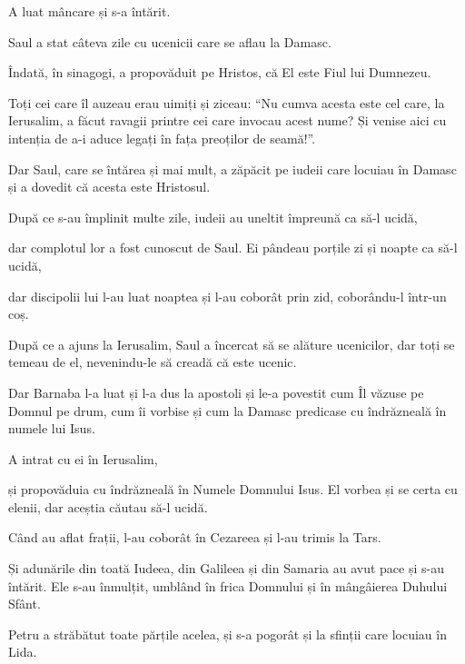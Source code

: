 {A luat mâncare și s-a întărit.

\par }{\PP Saul a stat câteva zile cu ucenicii care se aflau la Damasc.

Îndată, în sinagogi, a propovăduit pe Hristos, că El este Fiul lui Dumnezeu.

Toți cei care îl auzeau erau uimiți și ziceau: “Nu cumva acesta este cel care, la Ierusalim, a făcut ravagii printre cei care invocau acest nume? Și venise aici cu intenția de a-i aduce legați în fața preoților de seamă!”.


\par }{\PP {}Dar Saul, care se întărea și mai mult, a zăpăcit pe iudeii care locuiau în Damasc și a dovedit că acesta este Hristosul.

După ce s-au împlinit multe zile, iudeii au uneltit împreună ca să-l ucidă,

dar complotul lor a fost cunoscut de Saul. Ei pândeau porțile zi și noapte ca să-l ucidă,

dar discipolii lui l-au luat noaptea și l-au coborât prin zid, coborându-l într-un coș.


\par }{\PP {}După ce a ajuns la Ierusalim, Saul a încercat să se alăture ucenicilor, dar toți se temeau de el, nevenindu-le să creadă că este ucenic.

Dar Barnaba l-a luat și l-a dus la apostoli și le-a povestit cum Îl văzuse pe Domnul pe drum, cum îi vorbise și cum la Damasc predicase cu îndrăzneală în numele lui Isus.

A intrat cu ei în Ierusalim,

și propovăduia cu îndrăzneală în Numele Domnului Isus. El vorbea și se certa cu elenii,
dar aceștia căutau să-l ucidă.

Când au aflat frații, l-au coborât în Cezareea și l-au trimis la Tars.


\par }{\PP {}Și adunările din toată Iudeea, din Galileea și din Samaria au avut pace și s-au întărit. Ele s-au înmulțit, umblând în frica Domnului și în mângâierea Duhului Sfânt.


\par }{\PP {}Petru a străbătut toate părțile acelea, și s-a pogorât și la sfinții care locuiau în Lida.

}
